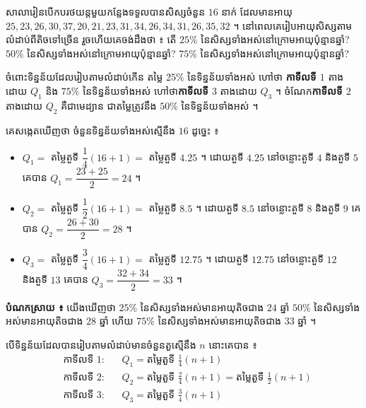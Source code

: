 \begin{example}[ឧទាហរណ៍]
សាលារៀនបើកបរថយន្តមួយកន្លែងទទួលបានសិស្សចំនួន $16$ នាក់ ដែលមានអាយុ $25, 23, 26, 30, 37, 20, 21, 23, 31, 34, 26, 34, 31, 26, 35, 32$ ។ នៅពេលគេរៀបអាយុសិស្សតាមលំដាប់ពីតិចទៅច្រើន រួចហើយគេចង់ដឹងថា ៖ តើ $25\%$ នៃសិស្សទាំងអស់នៅក្រោមអាយុប៉ុន្មានឆ្នាំ? $50\%$ នៃសិស្សទាំងអស់នៅក្រោមអាយុប៉ុន្មានឆ្នាំ? $75\%$ នៃសិស្សទាំងអស់នៅក្រោមអាយុប៉ុន្មានឆ្នាំ?
\end{example}
ចំពោះទិន្នន័យដែលរៀបតាមលំដាប់កើន តម្លៃ $25\%$ នៃទិន្នន័យទាំងអស់ ហៅថា \textbf{កាទីលទី $1$} តាងដោយ $Q_1$ និង $75\%$ នៃទិន្នន័យទាំងអស់ ហៅថា\textbf{កាទីលទី $3$} តាងដោយ $Q_3$ ។ ចំណែក\textbf{កាទីលទី $2$} តាងដោយ $Q_2$ គឺជាមេដ្យាន ជាតម្លៃត្រូវនឹង $50\%$ នៃទិន្នន័យទាំងអស់ ។
\begin{center}
\end{center}
គេសង្កេតឃើញថា ចំនួនទិន្នន័យទាំងអស់ស្មើនឹង $16$ ដូច្នេះ ៖
\begin{itemize}
  \item $Q_1 =$ តម្លៃតួទី $\dfrac{1}{4}(16 + 1) =$ តម្លៃតួទី $4.25$ ។ ដោយតួទី $4.25$ នៅចន្លោះតួទី $4$ និងតួទី $5$ គេបាន $Q_1 = \dfrac{23 + 25}{2} = 24$ ។
  \item $Q_2 =$ តម្លៃតួទី $\dfrac{1}{2}(16 + 1) =$ តម្លៃតួទី $8.5$ ។ ដោយតួទី $8.5$ នៅចន្លោះតួទី $8$ និងតួទី $9$ គេបាន $Q_2 = \dfrac{26 + 30}{2} = 28$ ។
  \item $Q_3 =$ តម្លៃតួទី $\dfrac{3}{4}(16 + 1) =$ តម្លៃតួទី $12.75$ ។ ដោយតួទី $12.75$ នៅចន្លោះតួទី $12$ និងតួទី $13$ គេបាន $Q_3 = \dfrac{32 + 34}{2} = 33$ ។
\end{itemize}
\textbf{បំណកស្រាយ ៖} យើងឃើញថា $25\%$ នៃសិស្សទាំងអស់មានអាយុតិចជាង $24$ ឆ្នាំ $50\%$ នៃសិស្សទាំងអស់មានអាយុតិចជាង $28$ ឆ្នាំ ហើយ $75\%$ នៃសិស្សទាំងអស់មានអាយុតិចជាង $33$ ឆ្នាំ ។

\begin{formulaBox}[ជាទូទៅ]
បើទិន្នន័យដែលបានរៀបតាមលំដាប់មានចំនួនតួស្មើនឹង $n$ នោះគេបាន ៖
\[
\begin{aligned}
&\text{កាទីលទី } 1 : && Q_1 = \text{តម្លៃតួទី } \frac{1}{4}(n + 1)\\
&\text{កាទីលទី } 2 : && Q_2 = \text{តម្លៃតួទី } \frac{2}{4}(n + 1) = \text{តម្លៃតួទី } \frac{1}{2}(n + 1)\\
&\text{កាទីលទី } 3 : && Q_3 = \text{តម្លៃតួទី } \frac{3}{4}(n + 1)
\end{aligned}
\]
\end{formulaBox}

